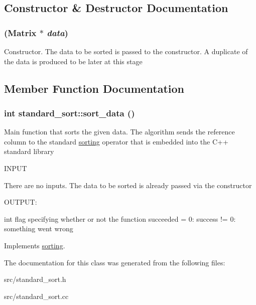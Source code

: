 \subsection{Constructor \& Destructor Documentation}
\hypertarget{classstandard__sort_a70a7e1ba1cae2d294b252f6182f81436}{
\subsubsection[{standard\_\-sort}]{ ({\bf Matrix} $\ast$ {\em data})}}
\label{d4/dec/classstandard__sort_a70a7e1ba1cae2d294b252f6182f81436}


Constructor. The data to be sorted is passed to the constructor. A duplicate of the data is produced to be later at this stage 

\subsection{Member Function Documentation}
\hypertarget{classstandard__sort_a34a0d914ebac6e328dfe371a1e1a8afb}{
\subsubsection[{sort\_\-data}]{\setlength{\rightskip}{0pt plus 5cm}int standard\_\-sort::sort\_\-data ()}}
\label{d4/dec/classstandard__sort_a34a0d914ebac6e328dfe371a1e1a8afb}


Main function that sorts the given data. The algorithm sends the reference column to the standard \hyperlink{classsorting}{sorting} operator that is embedded into the C++ standard library

\begin{DoxyVerb}
  INPUT 

  There are no inputs. The data to be sorted is already passed via the constructor

  OUTPUT:

  int       flag specifying whether or not the function succeeded
             = 0: success
	    != 0: something went wrong

\end{DoxyVerb}
 

Implements \hyperlink{classsorting_a94c4b729732743299f3dcd2505312381}{sorting}.

The documentation for this class was generated from the following files:\begin{DoxyCompactItemize}
\item 
src/standard\_\-sort.h\item 
src/standard\_\-sort.cc\end{DoxyCompactItemize}
